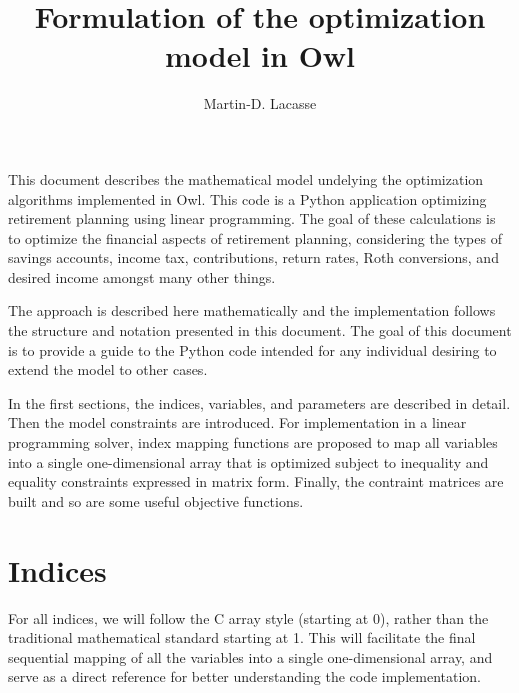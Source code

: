 \documentclass{article}[fleqn,12pt]
\begin{document}
\title{Formulation of the optimization model in Owl}
\author{Martin-D. Lacasse}
\maketitle
\thispagestyle{fancy}
\fancyhead{}

This document describes the mathematical model undelying
the optimization algorithms implemented in
Owl. This code is a Python application optimizing retirement
planning using linear programming. The goal of
these calculations is to optimize the financial aspects
of retirement planning, considering the types of savings accounts,
income tax, contributions, return rates, Roth conversions,
and desired income amongst many other things.

The approach is described here mathematically and the implementation
follows the structure and notation presented in this document.
The goal of this document is to provide a guide to the Python code
intended for any individual desiring to extend the model to other cases.

In the first sections, the indices, variables, and parameters are
described in detail. Then the model constraints are introduced.
For implementation in a linear programming solver, index mapping
functions are proposed to map all variables into a single
one-dimensional array that
is optimized subject to inequality and equality constraints
expressed in matrix form. Finally, the contraint matrices are built
and so are some useful objective functions.

\section{Indices}
For all indices, we will follow the C array style (starting at 0),
rather than the traditional mathematical standard starting at 1.
This will facilitate the final
sequential mapping of all the variables into a single one-dimensional array,
and serve as a direct reference for better understanding the code implementation.
\end{document}
